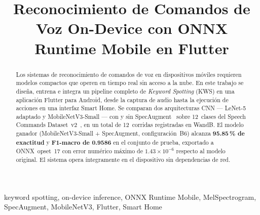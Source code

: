 \documentclass[conference]{IEEEtran}
\begin{document}
\title{Reconocimiento de Comandos de Voz On-Device con ONNX Runtime Mobile en Flutter}

\author{
   \and
}

\maketitle

\begin{abstract}
Los sistemas de reconocimiento de comandos de voz en dispositivos móviles
requieren modelos compactos que operen en tiempo real sin acceso a la nube.
En este trabajo se diseña, entrena e integra un pipeline completo de
\textit{Keyword Spotting} (KWS) en una aplicación Flutter para Android, desde
la captura de audio hasta la ejecución de acciones en una interfaz Smart Home.
Se comparan dos arquitecturas CNN — LeNet-5 adaptado y MobileNetV3-Small — con
y sin SpecAugment~\cite{park2019specaugment} sobre 12~clases del Speech
Commands Dataset~v2~\cite{warden2018speech}, en un total de 12~corridas
registradas en WandB.  El modelo ganador (MobileNetV3-Small + SpecAugment,
configuración~B6) alcanza \textbf{95.85\,\% de exactitud} y
\textbf{F1-macro de 0.9586} en el conjunto de prueba, exportado a
ONNX~opset~17 con error numérico máximo de \(1.43 \times 10^{-6}\) respecto
al modelo original.  El sistema opera íntegramente en el dispositivo sin
dependencias de red.
\end{abstract}

\begin{IEEEkeywords}
keyword spotting, on-device inference, ONNX Runtime Mobile,
MelSpectrogram, SpecAugment, MobileNetV3, Flutter, Smart Home
\end{IEEEkeywords}
\end{document}
